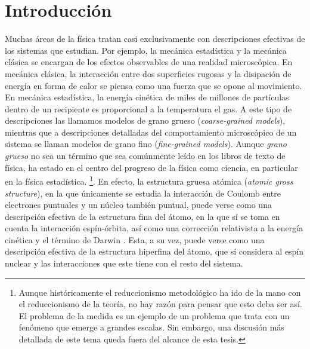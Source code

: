 \chapter{Introducción}



Muchas áreas de la física tratan casi exclusivamente con descripciones efectivas de los sistemas que estudian. Por ejemplo, la mecánica estadística y la mecánica clásica se encargan de los efectos observables de una realidad microscópica. En mecánica clásica, la interacción entre dos superficies rugosas y la disipación de energía en forma de calor se piensa como una fuerza que se opone al movimiento. En mecánica estadística, la energía cinética de miles de millones de partículas dentro de un recipiente es proporcional a la temperatura el gas. A este tipo de descripciones las llamamos modelos de grano grueso (\textit{coarse-grained models}), mientras que a descripciones detalladas del comportamiento microscópico de un sistema se llaman modelos de grano fino (\textit{fine-grained models}). Aunque \textit{grano grueso} no sea un término que sea comúnmente leído en los libros de texto de física, ha estado en el centro del progreso de la física como ciencia, en particular en la física estadística. \footnote{Aunque históricamente el reduccionismo metodológico ha ido de la mano con el reduccionismo de la teoría, no hay razón para pensar que esto deba ser así. El problema de la medida es un ejemplo de un problema que trata con un fenómeno que emerge a grandes escalas. Sin embargo, una discusión más detallada de este tema queda fuera del alcance de esta tesis.}. En efecto, la estructura gruesa atómica (\textit{atomic gross structure}), en la que únicamente se estudia la interacción de Coulomb entre electrones puntuales y un núcleo también puntual, puede verse como una descripción efectiva de la estructura fina del átomo, en la que sí se toma en cuenta la interacción espín-órbita, así como una corrección relativista a la energía cinética y el término de Darwin \cite{Bransden}. Esta, a su vez, puede verse como una descripción efectiva de la estructura hiperfina del átomo, que sí considera al espín nuclear y las interacciones que este tiene con el resto del sistema.


